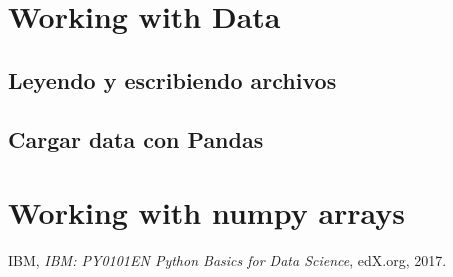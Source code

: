 \documentclass[10pt,a4paper]{article}
\begin{document}
\section{Working with Data}

\subsection{Leyendo y escribiendo archivos}
\subsection{Cargar data con Pandas}

\section{Working with numpy arrays}



\begin{thebibliography}{9}

  IBM,
  \textit{ IBM: PY0101EN Python Basics for Data Science},
  edX.org,
  2017.

\end{thebibliography}
\end{document}
